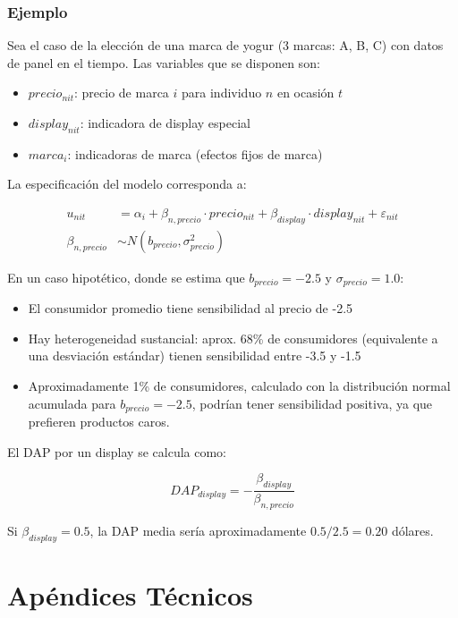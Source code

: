 \documentclass[
]{book}
\providecommand{\tightlist}{%
  \setlength{\itemsep}{0pt}\setlength{\parskip}{0pt}}
\begin{document}
\subsection{Ejemplo}\label{ejemplo-1}

Sea el caso de la elección de una marca de yogur (3 marcas: A, B, C) con datos de panel en el tiempo. Las variables que se disponen son:

\begin{itemize}
\tightlist
\item
  \(precio_{nit}\): precio de marca \(i\) para individuo \(n\) en ocasión \(t\)
\item
  \(display_{nit}\): indicadora de display especial
\item
  \(marca_i\): indicadoras de marca (efectos fijos de marca)
\end{itemize}

La especificación del modelo corresponda a:

\[
\begin{aligned}
u_{nit} &= \alpha_i + \beta_{n,precio} \cdot precio_{nit} + \beta_{display} \cdot display_{nit} + \varepsilon_{nit}\\
\beta_{n,precio} &\sim N(b_{precio}, \sigma^2_{precio})
\end{aligned}
\]

En un caso hipotético, donde se estima que \(b_{precio} = -2.5\) y \(\sigma_{precio} = 1.0\):

\begin{itemize}
\tightlist
\item
  El consumidor promedio tiene sensibilidad al precio de -2.5
\item
  Hay heterogeneidad sustancial: aprox. 68\% de consumidores (equivalente a una desviación estándar) tienen sensibilidad entre -3.5 y -1.5
\item
  Aproximadamente 1\% de consumidores, calculado con la distribución normal acumulada para \(b_{precio} = -2.5\), podrían tener sensibilidad positiva, ya que prefieren productos caros.
\end{itemize}

El DAP por un display se calcula como:

\[DAP_{display} = -\frac{\beta_{display}}{\beta_{n,precio}}\]

Si \(\beta_{display} = 0.5\), la DAP media sería aproximadamente \(0.5/2.5 = 0.20\) dólares.

\chapter{Apéndices Técnicos}\label{apuxe9ndices-tuxe9cnicos}
\end{document}
